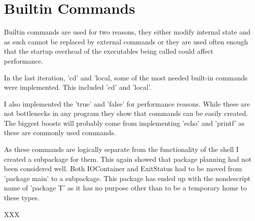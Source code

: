 \section{Builtin Commands}
\label{sec:builtins}
Builtin commands are used for two reasons, they either modify internal state and as such cannot be replaced by external commands or they are used often enough that the startup overhead of the executables being called could affect performance.

In the last iteration, 'cd' and 'local, some of the most needed built-in commands were implemented.
This included 'cd' and 'local'. 

I also implemented the 'true' and 'false' for performance reasons.
While these are not bottlenecks in any program they show that commands can be easily created.
The biggest boosts will probably come from implementing 'echo' and 'printf' as these are commonly used commands.

As these commands are logically separate from the functionality of the shell I created a subpackage for them.
This again showed that package planning had not been considered well.
Both IOContainer and ExitStatus had to be moved from 'package main' to a subpackage.
This package has ended up with the nondescript name of 'package T' as it has no purpose other than to be a temporary home to these types.

XXX